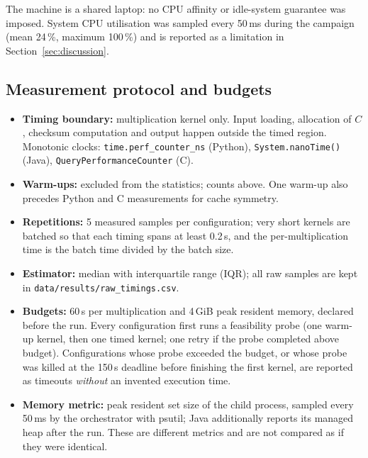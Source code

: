 \documentclass[11pt,a4paper]{article}
\begin{document}
The machine is a shared laptop: no CPU affinity or idle-system guarantee was
imposed. System CPU utilisation was sampled every 50\,ms during the campaign
(mean 24\,\%, maximum 100\,\%) and is reported as a limitation in
Section~\ref{sec:discussion}.

\subsection{Measurement protocol and budgets}

\begin{itemize}
  \item \textbf{Timing boundary:} multiplication kernel only. Input loading,
        allocation of $C$, checksum computation and output happen outside the
        timed region. Monotonic clocks: \texttt{time.perf\_counter\_ns} (Python),
        \texttt{System.nanoTime()} (Java), \texttt{QueryPerformance\hspace{0pt}Counter} (C).
  \item \textbf{Warm-ups:} excluded from the statistics; counts above. One warm-up
        also precedes Python and C measurements for cache symmetry.
  \item \textbf{Repetitions:} 5 measured samples per configuration; very short
        kernels are batched so that each timing spans at least 0.2\,s, and the
        per-multiplication time is the batch time divided by the batch size.
  \item \textbf{Estimator:} median with interquartile range (IQR); all raw samples
        are kept in \texttt{data/results/raw\_timings.csv}.
  \item \textbf{Budgets:} 60\,s per multiplication and 4\,GiB peak resident
        memory, declared before the run. Every configuration first runs a
        feasibility probe (one warm-up kernel, then one timed kernel; one retry if
        the probe completed above budget). Configurations whose probe exceeded the
        budget, or whose probe was killed at the 150\,s deadline before finishing
        the first kernel, are reported as timeouts \emph{without} an invented
        execution time.
  \item \textbf{Memory metric:} peak resident set size of the child process,
        sampled every 50\,ms by the orchestrator with psutil; Java additionally
        reports its managed heap after the run. These are different metrics and are
        not compared as if they were identical.
\end{itemize}
\end{document}
